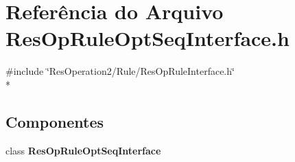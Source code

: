 \section{Referência do Arquivo Res\+Op\+Rule\+Opt\+Seq\+Interface.\+h}
\label{_res_op_rule_opt_seq_interface_8h}
{\ttfamily \#include \char`\"{}Res\+Operation2/\+Rule/\+Res\+Op\+Rule\+Interface.\+h\char`\"{}}\\*
\subsection*{Componentes}
\begin{DoxyCompactItemize}
\item 
class {\bf Res\+Op\+Rule\+Opt\+Seq\+Interface}
\end{DoxyCompactItemize}
